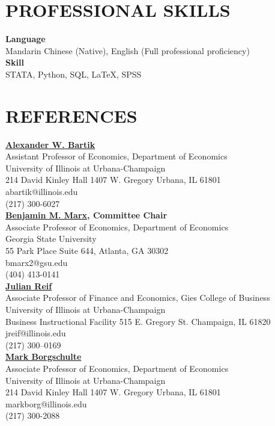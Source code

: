 \documentclass[a4paper,9pt]{extarticle}
\begin{document}
\section*{PROFESSIONAL SKILLS}

\noindent
\newline
\textbf{Language} \\
Mandarin Chinese (Native), English (Full professional proficiency) \\

\noindent
\textbf{Skill} \\
STATA, Python, SQL, \LaTeX, SPSS \\


\section*{REFERENCES}

\noindent
\textbf{\href{https://www.alexbartik.com}{Alexander W. Bartik}} \\
Assistant Professor of Economics, Department of Economics \\
University of Illinois at Urbana-Champaign \\
214 David Kinley Hall
1407 W. Gregory
Urbana, IL  61801\\
abartik@illinois.edu \\
(217) 300-6027 \\

\noindent
\newline
\textbf{\href{https://sites.google.com/site/benjaminmmarx/}{Benjamin M. Marx}, Committee Chair} \\
Associate Professor of Economics, Department of Economics \\
Georgia State University \\
55 Park Place Suite 644,
Atlanta, GA 30302\\
bmarx2@gsu.edu \\
(404) 413-0141 \\

\noindent
\textbf{\href{https://julianreif.com}{Julian Reif}} \\
Associate Professor of Finance and Economics, Gies College of Business \\
University of Illinois at Urbana-Champaign \\
Business Instructional Facility 515 E. Gregory St.
Champaign, IL 61820\\
jreif@illinois.edu \\
(217) 300–0169 \\

\noindent
\textbf{\href{https://sites.google.com/site/markborgschulte/home}{Mark Borgschulte}} \\
Associate Professor of Economics, Department of Economics \\
University of Illinois at Urbana-Champaign \\
214 David Kinley Hall
1407 W. Gregory
Urbana, IL  61801\\
markborg@illinois.edu \\
(217) 300-2088 \\
\end{document}
